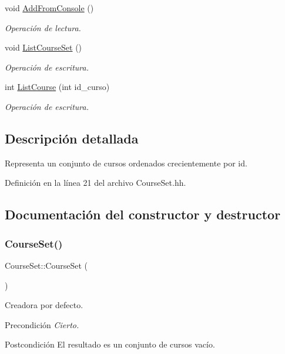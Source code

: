 \begin{DoxyCompactItemize}
void \mbox{\hyperlink{class_course_set_aee9d2b96c43a828049e02205736a4982}{Add\+From\+Console}} ()
\begin{DoxyCompactList}\small\item\em Operación de lectura. \end{DoxyCompactList}\item 
void \mbox{\hyperlink{class_course_set_a31726d4dcdefc4a218f9e1466fd2ef38}{List\+Course\+Set}} ()
\begin{DoxyCompactList}\small\item\em Operación de escritura. \end{DoxyCompactList}\item 
int \mbox{\hyperlink{class_course_set_aee3609cbaa62ae2be155754613d484e3}{List\+Course}} (int id\+\_\+curso)
\begin{DoxyCompactList}\small\item\em Operación de escritura. \end{DoxyCompactList}\end{DoxyCompactItemize}


\subsection{Descripción detallada}
Representa un conjunto de cursos ordenados crecientemente por id. 

Definición en la línea 21 del archivo Course\+Set.\+hh.



\subsection{Documentación del constructor y destructor}
\mbox{\label{class_course_set_ae0b73bd2e6bda115838ba65644e015bc}} 
\subsubsection{\texorpdfstring{Course\+Set()}{CourseSet()}}
{\footnotesize\ttfamily Course\+Set\+::\+Course\+Set (\begin{DoxyParamCaption}{ }\end{DoxyParamCaption})}



Creadora por defecto. 

\begin{DoxyPrecond}{Precondición}
{\itshape Cierto.} 
\end{DoxyPrecond}
\begin{DoxyPostcond}{Postcondición}
El resultado es un conjunto de cursos vacío. 
\end{DoxyPostcond}


